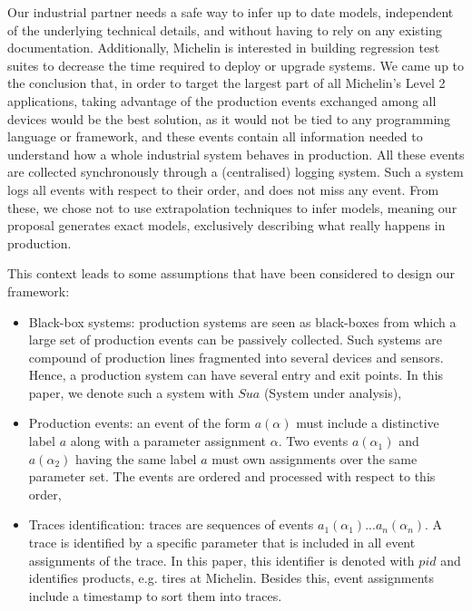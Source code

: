 Our industrial partner needs a safe way to infer up to date
models, independent of the underlying technical details, and
without having to rely on any existing documentation.
Additionally, Michelin is interested in building regression test
suites to decrease the time required to deploy or upgrade
systems. We came up to the conclusion that, in order to target
the largest part of all Michelin's Level 2 applications, taking
advantage of the production events exchanged among all devices
would be the best solution, as it would not be tied to any
programming language or framework, and these events contain all
information needed to understand how a whole industrial system
behaves in production. All these events are collected
synchronously through a (centralised) logging system. Such a
system logs all events with respect to their order, and does not
miss any event.  From these, we chose not to use extrapolation
techniques to infer models, meaning our proposal generates exact
models, exclusively describing what really happens in production.

This context leads to some assumptions that have been considered
to design our framework:

\begin{itemize}
    \item Black-box systems: production systems are seen as
    black-boxes from which a large set of production events can
    be passively collected. Such systems are compound of
    production lines fragmented into several devices and sensors.
    Hence, a production system can have several entry and exit
    points. In this paper, we denote such a system with $Sua$
    (System under analysis),

    \item Production events: an event of the form $a(\alpha)$
    must include a distinctive label $a$ along with a parameter
    assignment $\alpha$. Two events $a(\alpha_1)$ and
    $a(\alpha_2)$ having the same label $a$ must own assignments
    over the same parameter set. The events are ordered and
    processed with respect to this order,

    \item Traces identification: traces are sequences of events
    $a_1(\alpha_1)$...$a_n(\alpha_n)$. A trace is identified by a
    specific parameter that is included in all event assignments
    of the trace. In this paper, this identifier is denoted with
    $pid$ and identifies products, e.g. tires at Michelin.
    Besides this, event assignments include a timestamp to sort
    them into traces.
\end{itemize}

